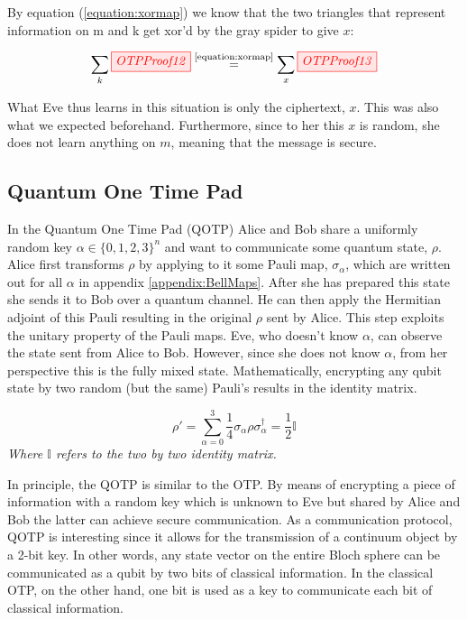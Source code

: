 \documentclass[]{article}
\newcommand{\equaltext}[1]{\ensuremath{\stackrel{\text{#1}}{=}}}
\begin{document}
By equation (\ref{equation:xormap}) we know that the two triangles that represent information on m and k get xor'd by the gray spider to give $x$:

\begin{equation}
\sum\limits_{k} \tikzfig{OTPProof12} \equaltext{\ref{equation:xormap}} \sum\limits_{x} \tikzfig{OTPProof13}
\end{equation}

What Eve thus learns in this situation is only the ciphertext, $x$. This was also what we expected beforehand. Furthermore, since to her this $x$ is random, she does not learn anything on $m$, meaning that the message is secure.

\subsection{Quantum One Time Pad}
\label{QOTP}
In the Quantum One Time Pad (QOTP) Alice and Bob share a uniformly random key $ \alpha \in \{0,1,2,3\}^n$ and want to communicate some quantum state, $\rho$. Alice first transforms $\rho$ by applying to it some Pauli map, $\sigma_\alpha$, which are written out for all $\alpha$ in appendix \ref{appendix:BellMaps}. After she has prepared this state she sends it to Bob over a quantum channel. He can then apply the Hermitian adjoint of this Pauli resulting in the original $\rho$ sent by Alice. This step exploits the unitary property of the Pauli maps. Eve, who doesn't know $\alpha$, can observe the state sent from Alice to Bob. However, since she does not know $\alpha$, from her perspective this is the fully mixed state. Mathematically, encrypting any qubit state by two random (but the same) Pauli's results in the identity matrix.

\begin{equation}
	\label{equation:OTPsecurity}
	\rho' = \sum\limits_{\alpha = 0}^3 \frac{1}{4} \sigma_\alpha \rho \sigma_\alpha^\dagger = \frac{1}{2}\mathbb{I}
\end{equation}
\textit{Where $\mathbb{I}$ refers to the two by two identity matrix.}

In principle, the QOTP is similar to the OTP. By means of encrypting a piece of information with a random key which is unknown to Eve but shared by Alice and Bob the latter can achieve secure communication. As a communication protocol, QOTP is interesting since it allows for the transmission of a continuum object by a 2-bit key. In other words, any state vector on the entire Bloch sphere can be communicated as a qubit by two bits of classical information. In the classical OTP, on the other hand, one bit is used as a key to communicate each bit of classical information.
\end{document}
